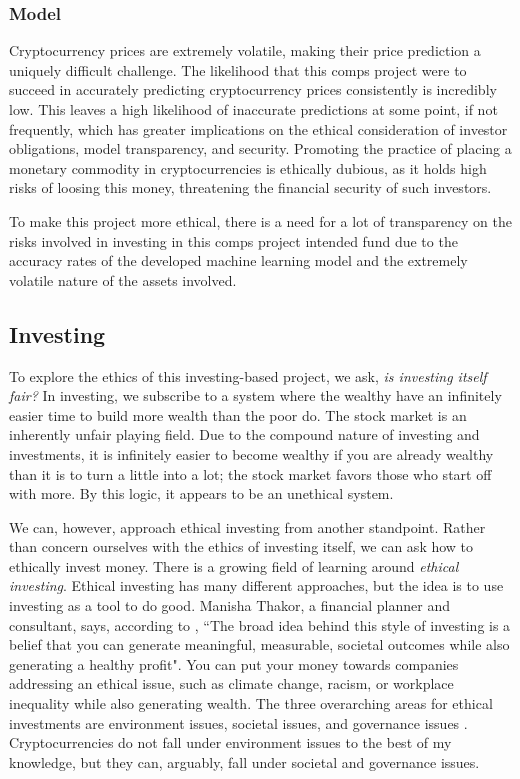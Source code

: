 \documentclass[10pt,twocolumn]{article}
\begin{document}
\subsubsection{Model}

Cryptocurrency prices are extremely volatile, making their price prediction a uniquely difficult challenge. The likelihood that this comps project were to succeed in accurately predicting cryptocurrency prices consistently is incredibly low. This leaves a high likelihood  of inaccurate predictions at some point, if not frequently, which has greater implications on the ethical consideration of investor obligations, model transparency, and security. Promoting the practice of placing a monetary commodity in cryptocurrencies is ethically dubious, as it holds high risks of loosing this money, threatening the financial security of such investors.

To make this project more ethical, there is a need for a lot of transparency on the risks involved in investing in this comps project intended fund due to the accuracy rates of the developed machine learning model and the extremely volatile nature of the assets involved.

\subsection{Investing}

To explore the ethics of this investing-based project, we ask, \textit{is investing itself fair?} In investing, we subscribe to a system where the wealthy have an infinitely easier time to build more wealth than the poor do. The stock market is an inherently unfair playing field. Due to the compound nature of investing and investments, it is infinitely easier to become wealthy if you are already wealthy than it is to turn a little into a lot; the stock market favors those who start off with more. By this logic, it appears to be an unethical system.

We can, however, approach ethical investing from another standpoint. Rather than concern ourselves with the ethics of investing itself, we can ask how to ethically invest money. There is a growing field of learning around \textit{ethical investing}. Ethical investing has many different approaches, but the idea is to use investing as a tool to do good. Manisha Thakor, a financial planner and consultant, says, according to , ``The broad idea behind this style of investing is a belief that you can generate meaningful, measurable, societal outcomes while also generating a healthy profit". You can put your money towards companies addressing an ethical issue, such as climate change, racism, or workplace inequality while also generating wealth. The three overarching areas for ethical investments are environment issues, societal issues, and governance issues \cite{LimitsOfEthicalInvesting}. Cryptocurrencies do not fall under environment issues to the best of my knowledge, but they can, arguably, fall under societal and governance issues.
\end{document}
